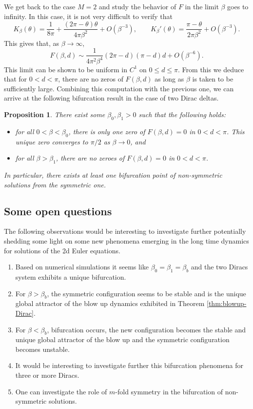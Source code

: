 \documentclass[10pt]{amsart}
\theoremstyle{plain}
\newtheorem{proposition}[theorem]{Proposition}
\theoremstyle{definition}
\let\bt\beta
\let\tht\theta
\begin{document}
We get back to the case $M=2$ and study the behavior of $F$ in the limit $\beta$ goes to infinity. In this case, it is not very difficult to verify that
\begin{equation*}
K_{\bt}(\tht) = \frac{1}{8\pi} + \frac{(2\pi-\tht)\tht}{4\pi \bt^2} + O(\bt^{-3}),\qquad K_{\bt}'(\tht) = \frac{\pi-\tht}{2\pi\bt^2} + O(\bt^{-3}).
\end{equation*}
This gives that, as $\bt\to\infty$,\vspace*{-3pt}
\begin{equation*}
F(\bt,d)\sim \frac{1}{4\pi^2 \bt^4} (2\pi-d)(\pi-d)d + O(\bt^{-6}).
\end{equation*}
This limit can be shown to be uniform in $C^1$ on $0\le d \le \pi$. From this we deduce that for $0<d<\pi$, there are no zeros of $F(\bt,d)$ as long as $\bt$ is taken to be sufficiently large. Combining this computation with the previous one, we can arrive at the following bifurcation result in the case of two Dirac deltas.
\begin{proposition}
There exist some $\bt_{0},\bt_{1}>0$ such that the following holds:
\begin{itemize}
\item for all $0<\bt<\bt_{0}$, there is only one zero of $F(\bt,d)=0$ in $0<d<\pi$. This unique zero converges to $\pi/2$ as $\bt\to0$, and
\item for all $\bt>\bt_{1}$, there are no zeroes of $F(\bt,d)=0$ in $0<d<\pi$.
\end{itemize} In particular, there exists at least one bifurcation point of non-symmetric solutions from the symmetric one.
\end{proposition}
\subsection{Some open questions}
The following observations would be interesting to investigate further potentially shedding some light on some new phenomena emerging in the long time dynamics for solutions of the 2d Euler equations.
\begin{enumerate}
\item Based on numerical simulations it seems like $\beta_0=\beta_1=\beta_b$ and the two Diracs system exhibits a unique bifurcation.
\item For $\beta> \beta_b$, the symmetric configuration seems to be stable and is the unique global attractor of the blow up dynamics exhibited in Theorem \ref{thm:blowup-Dirac}.
\item For $\beta< \beta_b$, bifurcation occurs, the new configuration becomes the stable and unique global attractor of the blow up and the symmetric configuration becomes unstable.
\item It would be interesting to investigate further this bifurcation phenomena for three or more Diracs.
\item One can investigate the role of $m$-fold symmetry in the bifurcation of non-symmetric solutions.
\end{enumerate}
\end{document}
